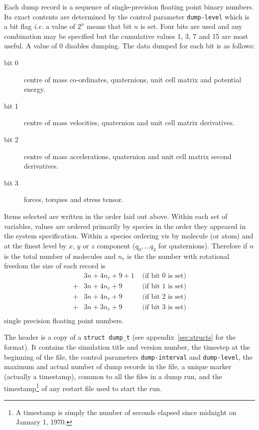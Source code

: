 Each dump record is a sequence of single-precision floating point
binary numbers.  Its exact contents are determined by the control
parameter \verb'dump-level' which is a bit flag {\em i.e.} a value
of $2^{n}$ means that bit $n$ is set.  Four bits are used and any
combination may be specified but the cumulative values 1, 3, 7
and 15 are most useful.  A value of 0 disables dumping. The data
dumped for each bit is as follows:
\begin{description}
\item[bit 0]	centre of mass co-ordinates, quaternions, unit cell matrix 
and potential energy.	      
\item[bit 1]	centre of mass velocities, quaternion and unit cell
matrix derivatives.
\item[bit 2]	centre of mass accelerations, quaternion and unit cell
matrix second derivatives.
\item[bit 3]    forces, torques and stress tensor.
\end{description}
Items selected are written in the order laid out above.  Within each
set of variables, values are ordered primarily by species in the order
they appeared in the system specification.  Within a species ordering
vis by molecule (or atom) and at the finest level by $x$, $y$ or $z$
component ($q_{0}, \ldots q_{3}$ for quaternions). Therefore if $n$ is
the total number of molecules and $n_{r}$ is the the number with
rotational freedom the size of each record is
\begin{displaymath}
\begin{array}{cll}
   & 3n + 4n_{r} + 9 + 1 & \mbox{ (if bit 0 is set)} \\
 + & 3n + 4n_{r} + 9 & \mbox{ (if bit 1 is set)} \\
 + & 3n + 4n_{r} + 9 & \mbox{ (if bit 2 is set)} \\
 + & 3n + 3n_{r} + 9 & \mbox{ (if bit 3 is set)} \\
\end{array}
\end{displaymath}
single precision floating point numbers.

The header is a copy of a \verb'struct dump_t' (see
appendix~\ref{sec:structs} for the format). It contains the simulation
title and version number, the timestep at the beginning of the file,
the control parameters \verb'dump-interval' and \verb'dump-level', the
maximum and actual number of dump records in the file, a unique marker
(actually a timestamp), common to all the files in a dump run, and the
timestamp\footnote{A timestamp is simply the number of seconds elapsed
since midnight on January 1, 1970.} of any restart file used to start
the run.

